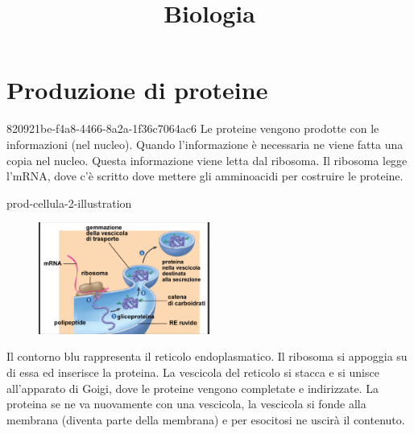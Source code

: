 \documentclass[preview]{standalone}
\begin{document}
\title{Biologia}
\genpage

\section{Produzione di proteine}

\begin{snippet}{820921be-f4a8-4466-8a2a-1f36c7064ac6}
    Le proteine vengono prodotte con le informazioni (nel nucleo).
    Quando l'informazione è necessaria ne viene fatta una copia nel nucleo.
    Questa informazione viene letta dal ribosoma.
    Il ribosoma legge l'mRNA,
    dove c'è scritto dove mettere gli amminoacidi per costruire le proteine.
\end{snippet}

\begin{snippet}{prod-cellula-2-illustration}
    \setlength{\intextsep}{0pt}%
    \begin{figure}
        \includegraphics[width=0.5\textwidth]{./resources/prod-cellula2.png}
    \end{figure}

    Il contorno blu rappresenta il reticolo endoplasmatico.
    Il ribosoma si appoggia su di essa ed inserisce la proteina.
    La vescicola del reticolo si stacca e si unisce all'apparato di Goigi, dove le proteine
    vengono completate e indirizzate.
    La proteina se ne va nuovamente con una vescicola, la vescicola si fonde alla membrana (diventa parte della membrana)
    e per esocitosi ne uscirà il contenuto.

    \wrapfill
\end{snippet}
\end{document}
